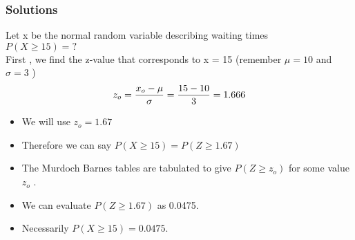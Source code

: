 \documentclass[a4]{beamer}
\begin{document}
\begin{frame}
\frametitle{Solutions}

Let x be the normal random variable describing waiting times\\
$P(X \geq 15) =?$ \\
\bigskip
     First , we find the z-value that corresponds to x = 15  (remember $\mu=10$ and $\sigma=3$  )\\
\[ z_o = { x_o - \mu \over \sigma }  = { 15 - 10 \over 3 } = 1.666 \]
\begin{itemize}
\item We will use $z_o =1.67$
\item Therefore we can say $P(X \geq 15 ) = P(Z \geq 1.67)$
\item The Murdoch Barnes tables are tabulated to give $P(Z \geq z_o)$ for some value $ z_o$ .
\item We can evaluate $P(Z \geq 1.67)$  as 0.0475.
\item Necessarily $P(X \geq 15) = 0.0475$.
\end{itemize}
\end{frame}
\end{document}
